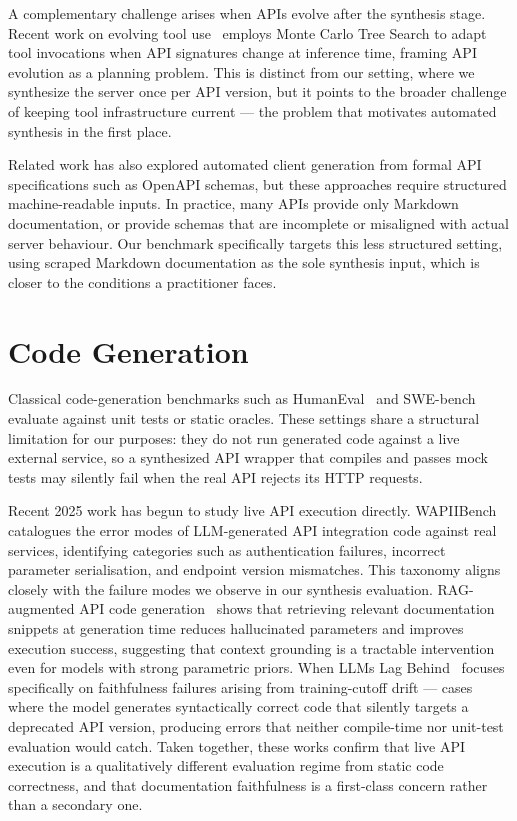 \documentclass[12pt]{report}
\begin{document}
A complementary challenge arises when APIs evolve after the synthesis stage.
Recent work on evolving tool use~\cite{evolvingtoolsiclr2025} employs
Monte Carlo Tree Search to adapt tool invocations when API signatures change
at inference time, framing API evolution as a planning problem. This is
distinct from our setting, where we synthesize the server once per API
version, but it points to the broader challenge of keeping tool infrastructure
current --- the problem that motivates automated synthesis in the first place.

Related work has also explored automated client generation from formal API
specifications such as OpenAPI schemas, but these approaches require
structured machine-readable inputs. In practice, many APIs provide only
Markdown documentation, or provide schemas that are incomplete or misaligned
with actual server behaviour. Our benchmark specifically targets this less
structured setting, using scraped Markdown documentation as the sole
synthesis input, which is closer to the conditions a practitioner faces.

\section{Code Generation}

Classical code-generation benchmarks such as HumanEval~\cite{chen2021codex}
and SWE-bench~\cite{jimenez2023swebench} evaluate against unit tests or static
oracles. These settings share a structural limitation for our purposes: they do
not run generated code against a live external service, so a synthesized API
wrapper that compiles and passes mock tests may silently fail when the real API
rejects its HTTP requests.

Recent 2025 work has begun to study live API execution directly.
WAPIIBench~\cite{wapiibench2025} catalogues the error modes of LLM-generated
API integration code against real services, identifying categories such as
authentication failures, incorrect parameter serialisation, and endpoint
version mismatches. This taxonomy aligns closely with the failure modes we
observe in our synthesis evaluation. RAG-augmented API code
generation~\cite{ragapidocs2025} shows that retrieving relevant documentation
snippets at generation time reduces hallucinated parameters and improves
execution success, suggesting that context grounding is a tractable
intervention even for models with strong parametric priors. When LLMs Lag
Behind~\cite{lagging2025} focuses specifically on faithfulness failures arising
from training-cutoff drift --- cases where the model generates syntactically
correct code that silently targets a deprecated API version, producing errors
that neither compile-time nor unit-test evaluation would catch. Taken together,
these works confirm that live API execution is a qualitatively different
evaluation regime from static code correctness, and that documentation
faithfulness is a first-class concern rather than a secondary one.
\end{document}
